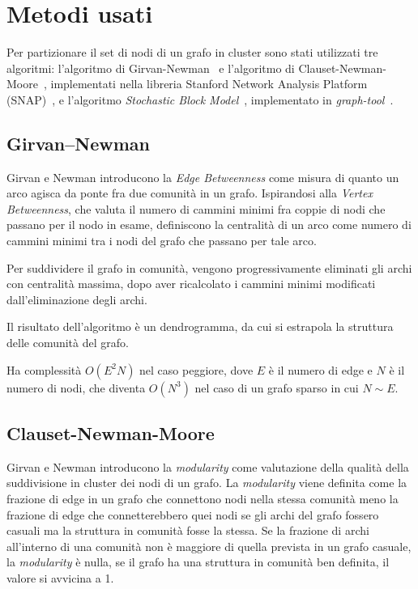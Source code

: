 \documentclass[12pt,a4paper,twoside]{report}
\begin{document}
\section{Metodi usati} \label{sec:metodi}

Per partizionare il set di nodi di un grafo in cluster sono stati utilizzati tre algoritmi:
l'algoritmo di Girvan-Newman~\cite{Girvan7821} e l'algoritmo di
Clauset-Newman-Moore~\cite{2004PhRvE..70f6111C}, implementati nella libreria Stanford Network
Analysis Platform (SNAP)~\cite{snapnets}, e l'algoritmo \textit{Stochastic Block
Model}~\cite{2014PhRvE..89a2804P}, implementato in
\textit{graph-tool}~\cite{peixoto_graph-tool_2014}.

\subsection{Girvan–Newman} \label{subsec:gn}
Girvan e Newman introducono la \textit{Edge Betweenness} come misura di quanto un arco agisca da
ponte fra due comunità in un grafo. Ispirandosi alla \textit{Vertex Betweenness}, che valuta il
numero di cammini minimi fra coppie di nodi che passano per il nodo in esame, definiscono la
centralità di un arco come numero di cammini minimi tra i nodi del grafo che passano per tale arco.

Per suddividere il grafo in comunità, vengono progressivamente eliminati gli archi con centralità
massima, dopo aver ricalcolato i cammini minimi modificati dall'eliminazione degli archi.

Il risultato dell'algoritmo è un dendrogramma, da cui si estrapola la struttura delle comunità del
grafo.

Ha complessità $O(E^2N)$ nel caso peggiore, dove $E$ è il numero di edge e $N$ è il numero di nodi,
che diventa $O(N^3)$ nel caso di un grafo sparso in cui $N\sim E$.

\subsection{Clauset-Newman-Moore} \label{subsec:cnm}

Girvan e Newman introducono la \textit{modularity} \cite{2004phrve..69b6113n} come valutazione della
qualità della suddivisione in cluster dei nodi di un grafo. La \textit{modularity} viene definita
come la frazione di edge in un grafo che connettono nodi nella stessa comunità meno la frazione di
edge che connetterebbero quei nodi se gli archi del grafo fossero casuali ma la struttura in
comunità fosse la stessa. Se la frazione di archi all'interno di una comunità non è maggiore di
quella prevista in un grafo casuale, la \textit{modularity} è nulla, se il grafo ha una struttura in
comunità ben definita, il valore si avvicina a 1.
\end{document}
